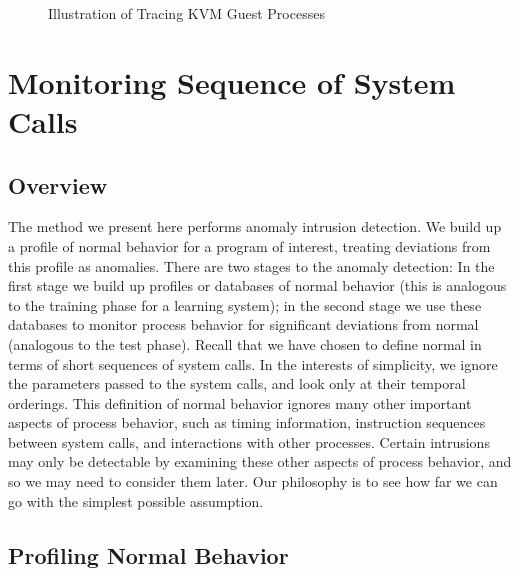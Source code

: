 \documentclass{report}
\begin{document}
\begin{spacing}{1.5}
\newpage
\vfill
{}
\begin{figure}[ht]
\centering
  \caption{Illustration of Tracing KVM Guest Processes}
\end{figure}













\section{Monitoring Sequence of System Calls}


\subsection{Overview}

The method we present here performs anomaly intrusion detection. We build up a profile of normal behavior
for a program of interest, treating deviations from this profile as anomalies. There are two
stages to the anomaly detection: In the first stage we build up profiles or databases of
normal behavior (this is analogous to the training phase for a learning system); in the
second stage we use these databases to monitor process behavior for significant
deviations from normal (analogous to the test phase).
Recall that we have chosen to define normal in terms of short sequences of system calls.
In the interests of simplicity, we ignore the parameters passed to the system calls, and
look only at their temporal orderings. This definition of normal behavior ignores many
other important aspects of process behavior, such as timing information, instruction
sequences between system calls, and interactions with other processes. Certain intrusions
may only be detectable by examining these other aspects of process behavior, and so we
may need to consider them later. Our philosophy is to see how far we can go with the
simplest possible assumption.

\subsection{Profiling Normal Behavior}


\end{spacing}
\end{document}
